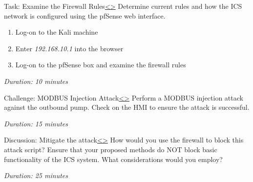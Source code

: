 \documentclass[12pt]{extarticle}
\newenvironment{instructionblock}{\Large\bgroup}{\egroup}
\newcommand{\ben}{\begin{enumerate}}
\newcommand{\een}{\end{enumerate}}
\newcounter{next}
\newcounter{prev}
\begin{document}
\pagebreak
{}
\begin{slide}{Task: Examine the Firewall Rules}{\hyperref[slide \theprev]{\textless}\hyperref[slide \thenext]{\textgreater}}
	\begin{instructionblock}
		Determine current rules and how the ICS network is configured using the pfSense web interface.
		\ben
			\item Log-on to the Kali machine
			\item Enter \textit{192.168.10.1} into the browser
			\item Log-on to the pfSense box and examine the firewall rules
		\een
	\end{instructionblock}
\end{slide}
\textit{Duration: 10 minutes}
\vfill
\noindent
\pagebreak

\pagebreak
{}
\begin{slide}{Challenge: MODBUS Injection Attack}{\hyperref[slide \theprev]{\textless}\hyperref[slide \thenext]{\textgreater}}
	\begin{instructionblock}
		Perform a MODBUS injection attack against the outbound pump. Check on the HMI to ensure the attack is successful. 
	\end{instructionblock}
\end{slide}
\textit{Duration: 15 minutes}
\vfill
\noindent
\pagebreak

\pagebreak
{}
\begin{slide}{Discussion: Mitigate the attack}{\hyperref[slide \theprev]{\textless}\hyperref[slide \thenext]{\textgreater}}
	\begin{instructionblock}
		How would you use the firewall to block this attack script? Ensure that your proposed methods do NOT block basic functionality of the ICS system. What considerations would you employ?
	\end{instructionblock}
\end{slide}
\textit{Duration: 25 minutes}
\vfill
\noindent
\pagebreak
\end{document}
